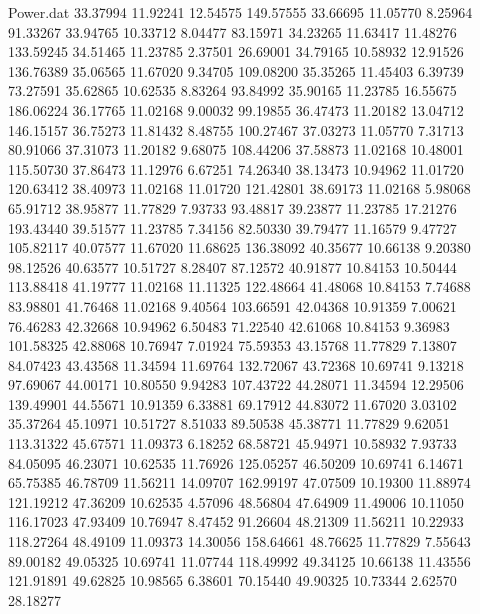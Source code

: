 \begin{filecontents}{Power.dat}
  33.37994   11.92241   12.54575  149.57555
  33.66695   11.05770    8.25964   91.33267
  33.94765   10.33712    8.04477   83.15971
  34.23265   11.63417   11.48276  133.59245
  34.51465   11.23785    2.37501   26.69001
  34.79165   10.58932   12.91526  136.76389
  35.06565   11.67020    9.34705  109.08200
  35.35265   11.45403    6.39739   73.27591
  35.62865   10.62535    8.83264   93.84992
  35.90165   11.23785   16.55675  186.06224
  36.17765   11.02168    9.00032   99.19855
  36.47473   11.20182   13.04712  146.15157
  36.75273   11.81432    8.48755  100.27467
  37.03273   11.05770    7.31713   80.91066
  37.31073   11.20182    9.68075  108.44206
  37.58873   11.02168   10.48001  115.50730
  37.86473   11.12976    6.67251   74.26340
  38.13473   10.94962   11.01720  120.63412
  38.40973   11.02168   11.01720  121.42801
  38.69173   11.02168    5.98068   65.91712
  38.95877   11.77829    7.93733   93.48817
  39.23877   11.23785   17.21276  193.43440
  39.51577   11.23785    7.34156   82.50330
  39.79477   11.16579    9.47727  105.82117
  40.07577   11.67020   11.68625  136.38092
  40.35677   10.66138    9.20380   98.12526
  40.63577   10.51727    8.28407   87.12572
  40.91877   10.84153   10.50444  113.88418
  41.19777   11.02168   11.11325  122.48664
  41.48068   10.84153    7.74688   83.98801
  41.76468   11.02168    9.40564  103.66591
  42.04368   10.91359    7.00621   76.46283
  42.32668   10.94962    6.50483   71.22540
  42.61068   10.84153    9.36983  101.58325
  42.88068   10.76947    7.01924   75.59353
  43.15768   11.77829    7.13807   84.07423
  43.43568   11.34594   11.69764  132.72067
  43.72368   10.69741    9.13218   97.69067
  44.00171   10.80550    9.94283  107.43722
  44.28071   11.34594   12.29506  139.49901
  44.55671   10.91359    6.33881   69.17912
  44.83072   11.67020    3.03102   35.37264
  45.10971   10.51727    8.51033   89.50538
  45.38771   11.77829    9.62051  113.31322
  45.67571   11.09373    6.18252   68.58721
  45.94971   10.58932    7.93733   84.05095
  46.23071   10.62535   11.76926  125.05257
  46.50209   10.69741    6.14671   65.75385
  46.78709   11.56211   14.09707  162.99197
  47.07509   10.19300   11.88974  121.19212
  47.36209   10.62535    4.57096   48.56804
  47.64909   11.49006   10.11050  116.17023
  47.93409   10.76947    8.47452   91.26604
  48.21309   11.56211   10.22933  118.27264
  48.49109   11.09373   14.30056  158.64661
  48.76625   11.77829    7.55643   89.00182
  49.05325   10.69741   11.07744  118.49992
  49.34125   10.66138   11.43556  121.91891
  49.62825   10.98565    6.38601   70.15440
  49.90325   10.73344    2.62570   28.18277

\end{filecontents}
